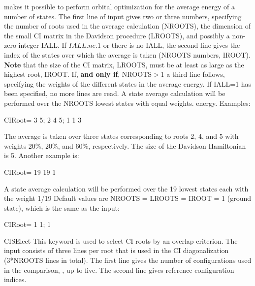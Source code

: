 \begin{keywordlist}
makes it possible to perform orbital optimization for the average
energy of a number of states. The first line of input gives two or three
numbers, specifying the number of roots used in the average
calculation (NROOTS), the dimension of the small CI matrix in
the Davidson procedure (LROOTS), and possibly a non-zero integer IALL.
If $IALL.ne.1$ or there is no IALL, the second line gives the index of
the states over which the average is taken (NROOTS numbers,
IROOT). {\bf Note} that the size of the CI matrix, LROOTS, must be at least as
large as the highest root, IROOT. If, {\bf and only if}, NROOTS$>$1 a third
line follows, specifying the weights of the different states in the average
energy. If IALL=1 has been specified, no more lines are read. A state average
calculation will be performed over the NROOTS lowest states with equal weights.
energy. Examples:
\begin{inputlisting}
CIRoot= 3 5; 2 4 5; 1 1 3
\end{inputlisting}
The average is taken over three states corresponding to roots 2, 4, and
5 with weights 20\%, 20\%, and 60\%, respectively. The size of the
Davidson Hamiltonian is 5. Another example is:
\begin{inputlisting}
CIRoot= 19 19 1
\end{inputlisting}
A state average calculation will be performed over the 19 lowest states each
with the weight 1/19
Default values are NROOTS = LROOTS = IROOT = 1 (ground state), which is the same
as the input:
\begin{inputlisting}
CIRoot= 1 1; 1
\end{inputlisting}
\item[CISElect]
This keyword is used to select CI roots by an overlap
criterion. The input consists of three lines per root
that is used in the CI diagonalization (3*NROOTS lines in total).
The first line gives the number of configurations used in the comparison,
, up to five.
The second line gives  reference configuration indices.

\end{keywordlist}
